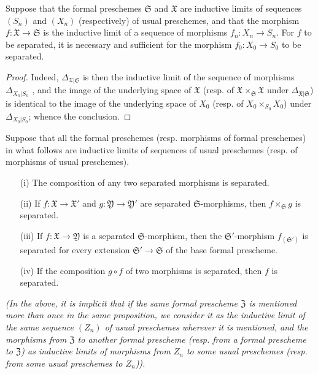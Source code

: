 \begin{proposition}[10.15.2]
\label{I.10.15.2}
Suppose that the formal preschemes $\mathfrak{S}$ and $\mathfrak{X}$ are inductive limits of sequences $(S_n)$ and $(X_n)$ (respectively) of usual preschemes, and that the morphism $f:\mathfrak{X}\to\mathfrak{S}$ is the inductive limit of a sequence of morphisms $f_n:X_n\to S_n$.
For $f$ to be separated, it is necessary and sufficient for the morphism $f_0:X_0\to S_0$ to be separated.
\end{proposition}

\begin{proof}
Indeed, $\Delta_{\mathfrak{X}|\mathfrak{S}}$ is then the inductive limit of the sequence of morphisms $\Delta_{X_n|S_n}$ , and the image of the underlying space of $\mathfrak{X}$ (resp. of $\mathfrak{X}\times_\mathfrak{S}\mathfrak{X}$ under $\Delta_{\mathfrak{X}|\mathfrak{S}}$) is identical to the image of the underlying space of $X_0$ (resp. of $X_0\times_{S_0}X_0$) under $\Delta_{X_0|S_0}$;
whence the conclusion.
\end{proof}

\begin{proposition}[10.15.3]
\label{I.10.15.3}
Suppose that all the formal preschemes (resp. morphisms of formal preschemes) in what follows are inductive limits of sequences of usual preschemes (resp. of morphisms of usual preschemes).
\begin{enumerate}
    \item[\rm{(i)}] The composition of any two separated morphisms is separated.
    \item[\rm{(ii)}] If $f:\mathfrak{X}\to\mathfrak{X}'$ and $g:\mathfrak{Y}\to\mathfrak{Y}'$ are separated $\mathfrak{S}$-morphisms, then $f\times_\mathfrak{S}g$ is separated.
    \item[\rm{(iii)}] If $f:\mathfrak{X}\to\mathfrak{Y}$ is a separated $\mathfrak{S}$-morphism, then the $\mathfrak{S}'$-morphism $f_{(\mathfrak{S}')}$ is separated for every extension $\mathfrak{S}'\to\mathfrak{S}$ of the base formal prescheme.
    \item[\rm{(iv)}] If the composition $g\circ f$ of two morphisms is separated, then $f$ is separated.
\end{enumerate}
\emph{(In the above, it is implicit that if the same formal prescheme $\mathfrak{Z}$ is mentioned more than once in the same proposition, we consider it as the inductive limit of the \emph{same} sequence $(Z_n)$ of usual preschemes wherever it is mentioned, and the morphisms from $\mathfrak{Z}$ to another formal prescheme (resp. from a formal prescheme to $\mathfrak{Z}$) as inductive limits of morphisms from $Z_n$ to some usual preschemes (resp. from some usual preschemes to $Z_n$)).}
\end{proposition}

